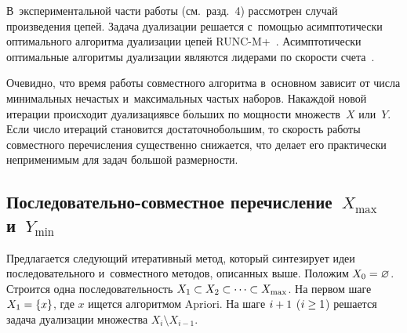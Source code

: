 \begin{multicols}{2}
    В~экспериментальной части работы (см.\ разд.~4) рас\-смот\-рен случай произведения цепей. 
    Задача дуализации решается с~помощью асимптотически оптимального алгоритма дуализации
     цепей \mbox{RUNC-M}+~\cite{7}. Асимптотически оптимальные алгоритмы дуализации 
     являются лидерами по ско\-рости счета~\cite{6}.

    Очевидно, что время работы совместного алгоритма в~основном зависит от чис\-ла
     минимальных не\-час\-тых и~максимальных час\-тых наборов. На\linebreak каж\-дой новой 
     итерации происходит дуализация\linebreak все б$\acute{\mbox{о}}$льших по мощ\-ности множеств~$X$ или~$Y$.\linebreak 
     Если число итераций становится достаточно\linebreak большим, то ско\-рость работы совместного 
     перечисления существенно снижается, что делает его практически неприменимым для 
     задач большой раз\-мер\-ности.
     { %
     
     }

    \subsection{Последовательно-совместное перечисление~$X_{\max}$ и~$Y_{\min}$}

    Предлагается следующий итеративный метод, который синтезирует идеи последовательного
     и~совместного методов, описанных выше. Положим $X_0 \hm= \varnothing$. 
     Строится одна по\-сле\-до\-ва\-тель\-ность $X_1 \hm\subset X_2 \hm\subset \dots \subset X_{\max}$. 
     На первом шаге $X_1\hm = \{x\}$, где $x$ ищется алгоритмом Apriori. На шаге $i \hm+ 1$ ($i \hm\geq 1$) 
     решается задача дуализации множества $X_{i} \setminus X_{i-1}$.

    
    
   \setcounter{figure}{1}
    \begin{figure*}[b] %
  \vspace*{12pt}
  \begin{center}  
    \mbox{%
\epsfxsize=163mm
}

\end{center}
\vspace*{-9pt}
    \label{12}
    \end{figure*}
     

\end{multicols}
